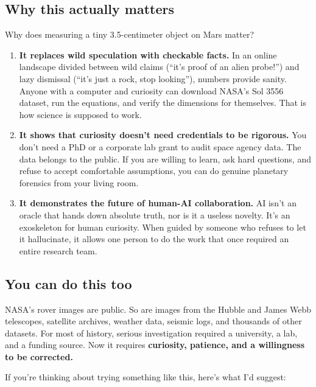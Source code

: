 \documentclass[11pt,a4paper]{article}
\newcommand{\horizontalrule}{}
\begin{document}
\subsection*{Why this actually matters}

Why does measuring a tiny 3.5-centimeter object on Mars matter?

\begin{enumerate}
	\item \textbf{It replaces wild speculation with checkable facts.} In an online landscape divided between wild claims (``it's proof of an alien probe!'') and lazy dismissal (``it's just a rock, stop looking''), numbers provide sanity. Anyone with a computer and curiosity can download NASA's Sol 3556 dataset, run the equations, and verify the dimensions for themselves. That is how science is supposed to work.
	\item \textbf{It shows that curiosity doesn't need credentials to be rigorous.} You don't need a PhD or a corporate lab grant to audit space agency data. The data belongs to the public. If you are willing to learn, ask hard questions, and refuse to accept comfortable assumptions, you can do genuine planetary forensics from your living room.
	\item \textbf{It demonstrates the future of human-AI collaboration.} AI isn't an oracle that hands down absolute truth, nor is it a useless novelty. It's an exoskeleton for human curiosity. When guided by someone who refuses to let it hallucinate, it allows one person to do the work that once required an entire research team.
\end{enumerate}

\horizontalrule

\subsection*{You can do this too}

NASA's rover images are public. So are images from the Hubble and James Webb telescopes, satellite archives, weather data, seismic logs, and thousands of other datasets. For most of history, serious investigation required a university, a lab, and a funding source. Now it requires \textbf{curiosity, patience, and a willingness to be corrected.}

If you're thinking about trying something like this, here's what I'd suggest:
\end{document}

